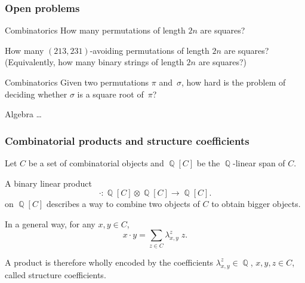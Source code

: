 \documentclass[unknownkeysallowed,10pt,xcolor={dvipsnames}]{beamer}
\DeclareMathOperator{\QQ}{\mathbb{Q}}
\begin{document}

\begin{frame}
  \frametitle{Open problems}

  \begin{block}{Combinatorics}
    How many permutations of length $2n$ are squares?

    \smallskip

    How many $(213,231)$-avoiding
    permutations of length $2n$ are squares? (Equivalently,
    how many binary strings of length $2n$ are squares?)
  \end{block}

  \medskip

  \begin{block}{Combinatorics}
    Given two permutations $\pi$ and~$\sigma$, how hard is the problem of
    deciding whether $\sigma$ is a square root of~$\pi$?
  \end{block}

  \medskip

  \begin{block}{Algebra}
    \ldots
  \end{block}

\end{frame}



\begin{frame} \frametitle{Combinatorial products and structure coefficients}
Let $C$ be a set of combinatorial objects and $\QQ[C]$ be the
$\QQ$-linear span of $C$.
\medskip

A binary linear product
\begin{equation*}
    \cdot : \QQ[C] \otimes \QQ[C] \to \QQ[C].
\end{equation*}
on $\QQ[C]$ describes a way to \alert{combine} two objects of
$C$ to obtain \alert{bigger} objects.
\medskip

In a general way, for any $x, y \in C$,
\begin{equation*}
    x \cdot y = \sum_{z \in C} \lambda_{x, y}^z \; z.
\end{equation*}
\medskip

A product is therefore wholly encoded by the coefficients
$\lambda_{x, y}^z \in \QQ$, $x, y, z \in C$, called
\alert{structure coefficients}.
\end{frame}
\end{document}
